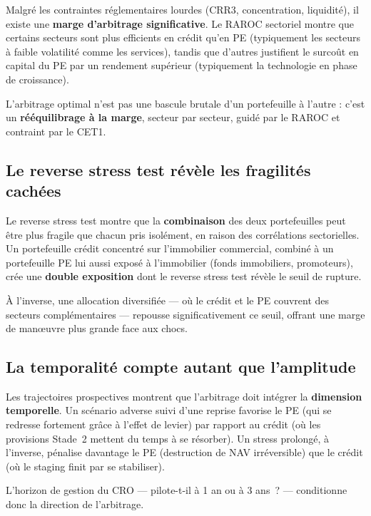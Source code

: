 \documentclass[12pt,a4paper]{article}
\begin{document}
Malgré les contraintes réglementaires lourdes (CRR3, concentration, liquidité), il existe une \textbf{marge d'arbitrage significative}. Le RAROC sectoriel montre que certains secteurs sont plus efficients en crédit qu'en PE (typiquement les secteurs à faible volatilité comme les services), tandis que d'autres justifient le surcoût en capital du PE par un rendement supérieur (typiquement la technologie en phase de croissance).

L'arbitrage optimal n'est pas une bascule brutale d'un portefeuille à l'autre : c'est un \textbf{rééquilibrage à la marge}, secteur par secteur, guidé par le RAROC et contraint par le CET1.

\subsection{Le reverse stress test révèle les fragilités cachées}

Le reverse stress test montre que la \textbf{combinaison} des deux portefeuilles peut être plus fragile que chacun pris isolément, en raison des corrélations sectorielles. Un portefeuille crédit concentré sur l'immobilier commercial, combiné à un portefeuille PE lui aussi exposé à l'immobilier (fonds immobiliers, promoteurs), crée une \textbf{double exposition} dont le reverse stress test révèle le seuil de rupture.

À l'inverse, une allocation diversifiée --- où le crédit et le PE couvrent des secteurs complémentaires --- repousse significativement ce seuil, offrant une marge de man\oe uvre plus grande face aux chocs.

\subsection{La temporalité compte autant que l'amplitude}

Les trajectoires prospectives montrent que l'arbitrage doit intégrer la \textbf{dimension temporelle}. Un scénario adverse suivi d'une reprise favorise le PE (qui se redresse fortement grâce à l'effet de levier) par rapport au crédit (où les provisions Stade~2 mettent du temps à se résorber). Un stress prolongé, à l'inverse, pénalise davantage le PE (destruction de NAV irréversible) que le crédit (où le staging finit par se stabiliser).

L'horizon de gestion du CRO --- pilote-t-il à 1 an ou à 3 ans~? --- conditionne donc la direction de l'arbitrage.

\end{document}

